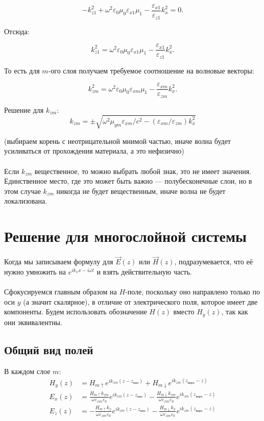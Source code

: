 \documentclass{article}
\begin{document}
\[
-k_{z1}^2 + \omega^2 \varepsilon_0 \mu_0 \varepsilon_{x1} \mu_1 - \frac{\varepsilon_{x1}}{\varepsilon_{z1}} k_x^2 = 0.
\]

Отсюда:

\[
k_{z1}^2 = \omega^2 \varepsilon_0 \mu_0 \varepsilon_{x1} \mu_1 - \frac{\varepsilon_{x1}}{\varepsilon_{z1}} k_x^2.
\]

То есть для $m$-ого слоя получаем требуемое соотношение на волновые векторы:

\[
k_{zm}^2 = \omega^2 \varepsilon_0 \mu_0 \varepsilon_{xm} \mu_1 - \frac{\varepsilon_{xm}}{\varepsilon_{zm}} k_x^2.
\]

Решение для $k_{zm}$:
\begin{equation}
k_{zm} = \pm \sqrt{\omega^2 \mu_{ym} \varepsilon_{xm} / c^2 - (\varepsilon_{xm} / \varepsilon_{zm}) k_x^2}
\end{equation}

(выбираем корень с неотрицательной мнимой частью, иначе волна будет усиливаться от прохождения материала, а это нефизично)
\\
\\
Если $k_{zm}$ вещественное, то можно выбрать любой знак, это не имеет значения. Единственное место, где это может быть важно — полубесконечные слои, но в этом случае $k_{zm}$ никогда не будет вещественным, иначе волна не будет локализована.

\clearpage

\section{Решение для многослойной системы}

Когда мы записываем формулу для $\vec{E}(z)$ или $\vec{H}(z)$, подразумевается, что её нужно умножить на $e^{i k_x x - i \omega t}$ и взять действительную часть.
\\
\\
Сфокусируемся главным образом на $H$-поле, поскольку оно направлено только по оси $y$ (а значит скалярное), в отличие от электрического поля, которое имеет две компоненты. Будем использовать обозначение $H(z)$ вместо $H_y(z)$, так как они эквивалентны.

\subsection{Общий вид полей}

В каждом слое $m$:
\begin{align}
H_y(z) &= H_{m\uparrow} e^{i k_{zm} (z-z_{\text{низ}})} + H_{m\downarrow} e^{i k_{zm} (z_{\text{верх}}-z)} \\
E_x(z) &= \frac{H_{m\uparrow} k_{zm}}{\omega \varepsilon_{xm} \varepsilon_0} e^{i k_{zm} (z-z_{\text{низ}})} - \frac{H_{m\downarrow} k_{zm}}{\omega \varepsilon_{xm} \varepsilon_0} e^{i k_{zm} (z_{\text{верх}}-z)} \\
E_z(z) &= -\frac{H_{m\uparrow} k_x}{\omega \varepsilon_{zm} \varepsilon_0} e^{i k_{zm} (z-z_{\text{низ}})} - \frac{H_{m\downarrow} k_x}{\omega \varepsilon_{zm} \varepsilon_0} e^{i k_{zm} (z_{\text{верх}}-z)}
\end{align}
\end{document}
